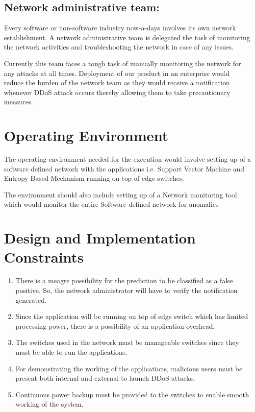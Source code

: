 \documentclass[12pt,a4paper,final]{report}
\begin{document}
\subsection{Network administrative team:}
Every software or non-software industry now-a-days involves its own network establishment. A network administrative team is delegated the task of monitoring the network activities and troubleshooting the network in case of any issues. 
\par
Currently this team faces a tough task of manually monitoring the network for any attacks at all times.
Deployment of our product in an enterprise would reduce the burden of the network team as they would receive a notification whenever DDoS attack occurs thereby allowing them to take precautionary measures.

\section{Operating Environment}
The operating environment needed for the execution would involve setting up of a software defined network with the applications i.e. Support Vector Machine and Entropy Based Mechanism running on top of edge switches. 
\par
The environment should also include setting up of a Network monitoring tool which would monitor the entire Software defined network for anomalies 

\section{Design and Implementation Constraints}
\begin{enumerate}
\item
There is a meagre possibility for the prediction to be classified as a false positive. So, the network administrator will have to verify the notification generated.

\item
Since the application will be running on top of edge switch which has limited processing power, there is a possibility of an application overhead.

\item
The switches used in the network must be manageable switches since they must be able to run the applications.

\item
For demonstrating the working of the applications, malicious users must be present both internal and external to launch DDoS attacks.

\item
Continuous power backup must be provided to the switches to enable smooth working of the system. 
\end{enumerate}
\end{document}
